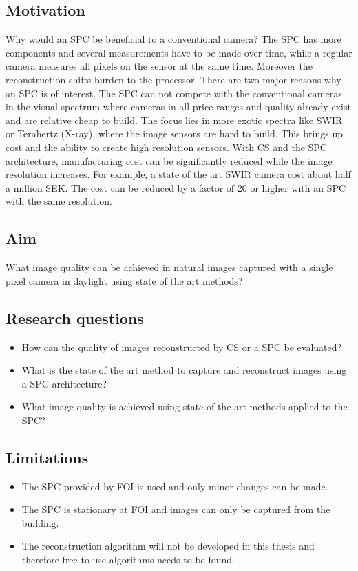   

 
\subsection{Motivation}
Why would an SPC be beneficial to a conventional camera? The SPC has more components and several measurements have to be made over time, while a regular camera measures all pixels on the sensor at the same time. Moreover the reconstruction shifts burden to the processor. There are two major reasons why an SPC is of interest. The SPC can not compete with the conventional cameras in the visual spectrum where cameras in all price ranges and quality already exist and are relative cheap to build. The focus lies in more exotic spectra like SWIR or Terahertz (X-ray), where the image sensors are hard to build. This brings up cost and the ability to create high resolution sensors. With CS and the SPC architecture, manufacturing cost can be significantly reduced while the image resolution increases. For example, a state of the art SWIR camera cost about half a million SEK. The cost can be reduced by a factor of 20 or higher with an SPC with the same resolution. 

\subsection{Aim} 
\label{sec:aim}
What image quality can be achieved in natural images captured with a single pixel camera in daylight using state of the art methods?\\[0.1in]  


\subsection{Research questions} 
\label{sec:RQ}
\begin{itemize}
    \item How can the quality of images reconstructed by CS or a SPC be evaluated?
    \item What is the state of the art method to capture and reconstruct images using a SPC architecture?
    \item What image quality is achieved using state of the art methods applied to the SPC?
\end{itemize}

\subsection{Limitations}
\begin{itemize}
    \item The SPC provided by FOI is used and only minor changes can be made.
    \item The SPC is stationary at FOI and images can only be captured from the building.
    \item The reconstruction algorithm will not be developed in this thesis and therefore free to use algorithms needs to be found.
\end{itemize}



